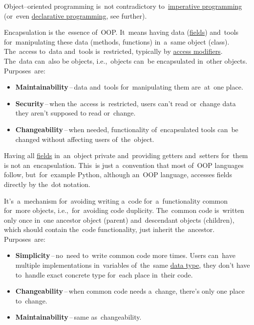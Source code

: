 \warning Object--oriented programming is~not contradictory to~\hyperref[imperativeprogramming]{imperative programming} (or~even \hyperref[declarativeprogramming]{declarative programming}, see further).


\label{encapsulation}
Encapsulation is the~essence of~OOP. It~means having data (\hyperref[variablefieldproperty]{fields}) and~tools for~manipulating these data (methods, functions) in~a~same object (class). The~access to~data and~tools is~restricted, typically by \hyperref[javaaccessmodifiers]{access modifiers}. The~data can~also be objects, i.e.,~objects can~be encapsulated in~other objects. Purposes~are:
\begin{itemize}
    \item \textbf{Maintainability}\,--\,data and~tools for~manipulating them are~at~one place.
    \item \textbf{Security}\,--\,when the~access is~restricted, users can't read or~change data they aren't supposed to read or~change.
    \item \textbf{Changeability}\,--\,when needed, functionality of~encapsulated tools can~be changed without affecting users of~the~object.
\end{itemize}

\warning Having all \hyperref[variablefieldproperty]{fields} in~an~object private and~providing getters and~setters for~them is not an~encapsulation. This~is just a~convention that most of~OOP languages follow, but~for~example Python, although an~OOP language, accesses fields directly by the~dot notation.

\label{inheritance}
It's~a~mechanism for~avoiding writing a~code for~a~functionality common for~more objects, i.e.,~for~avoiding code duplicity. The~common code is~written only once in~one ancestor object (parent) and~descendant objects (children), which should contain the~code functionality, just inherit the~ancestor. Purposes~are:
\begin{itemize}
    \item \textbf{Simplicity}\,--\,no~need to~write common code more times. Users can~have multiple implementations in~variables of~the~same \hyperref[datatypes]{data type}, they don't have to~handle exact concrete type for~each place in~their code.
    \item \textbf{Changeability}\,--\,when common code needs a~change, there's only one place to~change.
    \item \textbf{Maintainability}\,--\,same as~changeability.
\end{itemize}

